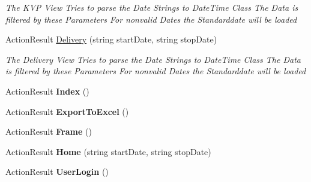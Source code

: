 \begin{DoxyCompactItemize}
\begin{DoxyCompactList}\small\item\em The K\+VP View Tries to parse the Date Strings to Date\+Time Class The Data is filtered by these Parameters For nonvalid Dates the Standarddate will be loaded \end{DoxyCompactList}\item 
Action\+Result \hyperlink{classkpi_mvc_api_1_1_controllers_1_1_home_controller_a0fe5ac7be69616c8f56e8938e042cc27}{Delivery} (string start\+Date, string stop\+Date)
\begin{DoxyCompactList}\small\item\em The Delivery View Tries to parse the Date Strings to Date\+Time Class The Data is filtered by these Parameters For nonvalid Dates the Standarddate will be loaded \end{DoxyCompactList}\item 
\mbox{\label{classkpi_mvc_api_1_1_controllers_1_1_home_controller_a10e3c3151fdc896f23d1ed374bdcd6cf}} 
Action\+Result {\bfseries Index} ()
\item 
\mbox{\label{classkpi_mvc_api_1_1_controllers_1_1_home_controller_a632bd6044f851bdf520c08b6fbf9604e}} 
Action\+Result {\bfseries Export\+To\+Excel} ()
\item 
\mbox{\label{classkpi_mvc_api_1_1_controllers_1_1_home_controller_a8fe51f06ec9db44e1766f89691af44f6}} 
Action\+Result {\bfseries Frame} ()
\item 
\mbox{\label{classkpi_mvc_api_1_1_controllers_1_1_home_controller_a136db913ab3394130e98d9e9376f2be9}} 
Action\+Result {\bfseries Home} (string start\+Date, string stop\+Date)
\item 
\mbox{\label{classkpi_mvc_api_1_1_controllers_1_1_home_controller_a52ba84d65a16f3ec9f7c18ef46313b23}} 
Action\+Result {\bfseries User\+Login} ()
\item 
\mbox{\label{classkpi_mvc_api_1_1_controllers_1_1_home_controller_ae5c2fcc4413eda2cab2775cd9819efca}} 

\end{DoxyCompactItemize}
